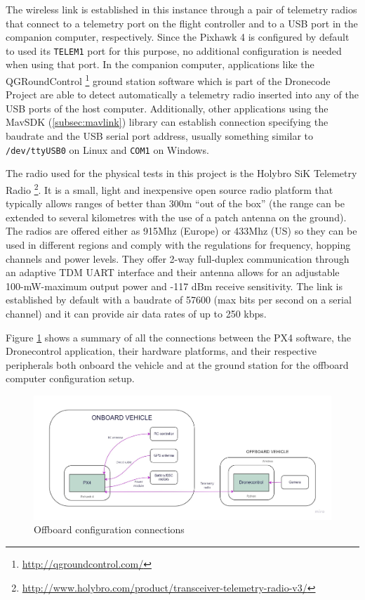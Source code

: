 The wireless link is established in this instance through a pair of telemetry radios that connect to a telemetry port on the flight controller and to a USB port in the companion computer, respectively.
Since the Pixhawk 4 is configured by default to used its \texttt{TELEM1} port for this purpose, no additional configuration is needed when using that port.
In the companion computer, applications like the QGRoundControl \footnote{\url{http://qgroundcontrol.com/}} ground station software which is part of the Dronecode Project are able to detect automatically a telemetry radio inserted into any of the USB ports of the host computer.
Additionally, other applications using the MavSDK (\ref{subsec:mavlink}) library can establish connection specifying the baudrate and the USB serial port address, usually something similar to \texttt{/dev/ttyUSB0} on Linux and \texttt{COM1} on Windows.

The radio used for the physical tests in this project is the Holybro SiK Telemetry Radio \footnote{\url{http://www.holybro.com/product/transceiver-telemetry-radio-v3/}}.
It is a small, light and inexpensive open source radio platform that typically allows ranges of better than 300m “out of the box” (the range can be extended to several kilometres with the use of a patch antenna on the ground).
The radios are offered either as 915Mhz (Europe) or 433Mhz (US) so they can be used in different regions and comply with the regulations for frequency, hopping channels and power levels.
They offer 2-way full-duplex communication through an adaptive TDM UART interface and their antenna allows for an adjustable 100-mW-maximum output power and -117 dBm receive sensitivity.
The link is established by default with a baudrate of 57600 (max bits per second on a serial channel) and it can provide air data rates of up to 250 kbps.

Figure \ref{fig:offboard-config} shows a summary of all the connections between the PX4 software, the Dronecontrol application, their hardware platforms, and their respective peripherals both onboard the vehicle and at the ground station for the offboard computer configuration setup.
\begin{figure}
  \centering
  \includegraphics[width=\textwidth,keepaspectratio]{img/offboard-diagram.jpg}
  \caption{Offboard configuration connections}
  \label{fig:offboard-config}
\end{figure}


